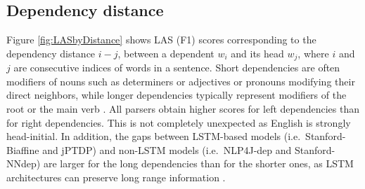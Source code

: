 \documentclass[twocolumn,hyperref]{bmcart}\pdfoutput=1
\newcommand{\CHANGEA}[1]{#1}
\begin{document}
\subsection*{Dependency distance}

Figure \ref{fig:LASbyDistance}  shows LAS (F1) scores corresponding to  the dependency distance $i - j$, between a dependent $w_i$ and its head $w_j$, where $i$ and $j$ are consecutive indices of words in a sentence.  Short dependencies are often modifiers of nouns such
as determiners or adjectives or pronouns modifying their direct neighbors, while longer  dependencies typically represent modifiers of the root or the main verb   \cite{mcdonald-nivre:2007:EMNLP-CoNLL2007}.
All parsers obtain higher scores for left dependencies than  for  right dependencies. This is not completely  unexpected as English is strongly head-initial. 
In addition, the gaps between LSTM-based models (i.e.\ Stanford-Biaffine and jPTDP) and non-LSTM models (i.e.\ NLP4J-dep and Stanford-NNdep) are larger for the long dependencies than for the shorter ones, as LSTM architectures can preserve long range information \cite{Graves2008}. 




  \begin{table}[!t]
  \caption{\CHANGEA{LAS (F1) scores  of Stanford-Biaffine on GENIA,  by frequent dependency labels in the  left dependencies. ``Prop.'' denotes the occurrence proportion in each distance bin.}}
  \centering
{}
\label{tab:depbylasposjPTDP}
\end{table}
\end{document}
